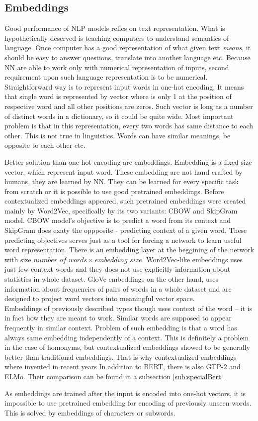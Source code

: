 \subsection{Embeddings}
Good performance of NLP models relies on text representation. What is hypothetically deserved is teaching computers to understand semantics of language. Once computer has a good representation of what given text \textit{means}, it should be easy to answer questions, translate into another language etc. Because NN are able to work only with numerical representation of inputs, second requirement upon such language representation is to be numerical. Straightforward way is to represent input words in one-hot encoding. It means that single word is represented by vector where is only 1 at the position of respective word and all other positions are zeros.%
 Such vector is long as a number of distinct words in a dictionary, so it could be quite wide. Most important problem is that in this representation, every two words has same distance to each other. This is not true in linguistics. Words can have similar meanings, be opposite to each other etc.
\par
Better solution than one-hot encoding are embeddings. Embedding is a fixed-size vector, which represent input word. These embedding are not hand crafted by humans, they are learned by NN. They can be learned for every specific task from scratch or it is possible to use good pretrained embeddings. Before contextualized embeddings appeared, such pretrained embeddings were created mainly by Word2Vec, specifically by its two variants: CBOW and SkipGram model. %
CBOW model's objective is to predict a word from its context and SkipGram does exaty the oppposite - predicting context of a given word. These predicting objectives serves just as a tool for forcing a network to learn useful word representation. There is an embedding layer at the beggining of the network with size $number\_of\_words \times embedding\_size$. Word2Vec-like embeddings uses just few context words and they does not use explicitly information about statistics in whole dataset. GloVe %
embeddings on the other hand, uses information about frequencies of pairs of words in a whole dataset and are designed to project word vectors into meaningful vector space. 
\\
Embeddings of previously described types though uses context of the word -- it is in fact how they are meant to work. Similar words are supposed to appear frequently in similar context. Problem of such embedding is that a word has always same embedding independently of a context. This is definitely a problem in the case of homonyms, but contextualized embeddings showed to be generally better than traditional embeddings. %
That is why contextualized embeddings where invented in recent years %
In addition to BERT, there is also GTP-2 and ELMo. Their comparison can be found in a subsection \ref{sub:specialBert}. 
\par
As embeddings are trained after the input is encoded into one-hot vectors, it is impossible to use pretrained embedding for encoding of previously unseen words. This is solved by embeddings of characters or subwords.


